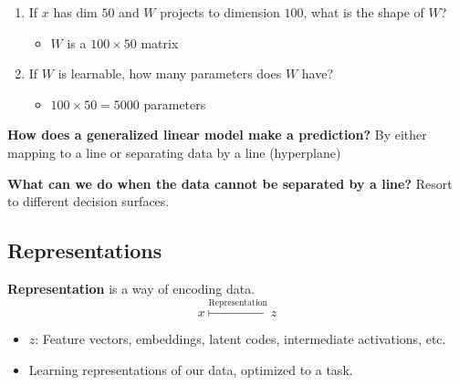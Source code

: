 \begin{example}
    \begin{enumerate}
        \item If $x$ has dim $50$ and $W$ projects to dimension $100$, what is the shape of $W$?
        \begin{itemize}
            \item $W$ is a $100 \times 50$ matrix
        \end{itemize}
        \item If $W$ is learnable, how many parameters does $W$ have?
        \begin{itemize}
            \item $100 \times 50 = 5000$ parameters
        \end{itemize}
    \end{enumerate}
\end{example}

\begin{notes} \textbf{How does a generalized linear model make a prediction?}
    By either mapping to a line or separating data by a line (hyperplane)
\end{notes}

\begin{notes} \textbf{What can we do when the data cannot be separated by a line?}
    Resort to different decision surfaces.
\end{notes}

\subsection{Representations}
\begin{definition}
    \textbf{Representation} is a way of encoding data.
    \begin{equation}
        x \overset{\text{Representation}}{\mapsto} z
    \end{equation}
    \begin{itemize}
        \item $z$: Feature vectors, embeddings, latent codes, intermediate activations, etc.
    \end{itemize}
\end{definition}

\begin{notes}
    \begin{itemize}
        \item Learning representations of our data, optimized to a task.
    \end{itemize}
\end{notes}

